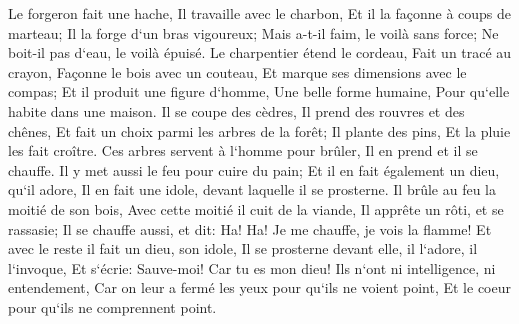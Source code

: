 \verse Le forgeron fait une hache, Il travaille avec le charbon, Et il la façonne à coups de marteau; Il la forge d`un bras vigoureux; Mais a-t-il faim, le voilà sans force; Ne boit-il pas d`eau, le voilà épuisé. 
\verse Le charpentier étend le cordeau, Fait un tracé au crayon, Façonne le bois avec un couteau, Et marque ses dimensions avec le compas; Et il produit une figure d`homme, Une belle forme humaine, Pour qu`elle habite dans une maison. 
\verse Il se coupe des cèdres, Il prend des rouvres et des chênes, Et fait un choix parmi les arbres de la forêt; Il plante des pins, Et la pluie les fait croître. 
\verse Ces arbres servent à l`homme pour brûler, Il en prend et il se chauffe. Il y met aussi le feu pour cuire du pain; Et il en fait également un dieu, qu`il adore, Il en fait une idole, devant laquelle il se prosterne. 
\verse Il brûle au feu la moitié de son bois, Avec cette moitié il cuit de la viande, Il apprête un rôti, et se rassasie; Il se chauffe aussi, et dit: Ha! Ha! Je me chauffe, je vois la flamme! 
\verse Et avec le reste il fait un dieu, son idole, Il se prosterne devant elle, il l`adore, il l`invoque, Et s`écrie: Sauve-moi! Car tu es mon dieu! 
\verse Ils n`ont ni intelligence, ni entendement, Car on leur a fermé les yeux pour qu`ils ne voient point, Et le coeur pour qu`ils ne comprennent point. 
